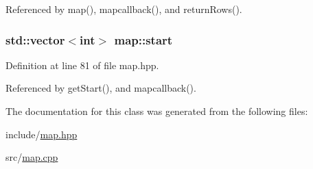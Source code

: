 Referenced by map(), mapcallback(), and return\+Rows().

\subsubsection[{\texorpdfstring{start}{start}}]{\setlength{\rightskip}{0pt plus 5cm}std\+::vector$<$int$>$ map\+::start}\hypertarget{classmap_a73ea3c7b79de5a8b5733b7babc21e68b}{}\label{classmap_a73ea3c7b79de5a8b5733b7babc21e68b}


Definition at line 81 of file map.\+hpp.



Referenced by get\+Start(), and mapcallback().



The documentation for this class was generated from the following files\+:\begin{DoxyCompactItemize}
\item 
include/\hyperlink{map_8hpp}{map.\+hpp}\item 
src/\hyperlink{map_8cpp}{map.\+cpp}\end{DoxyCompactItemize}
